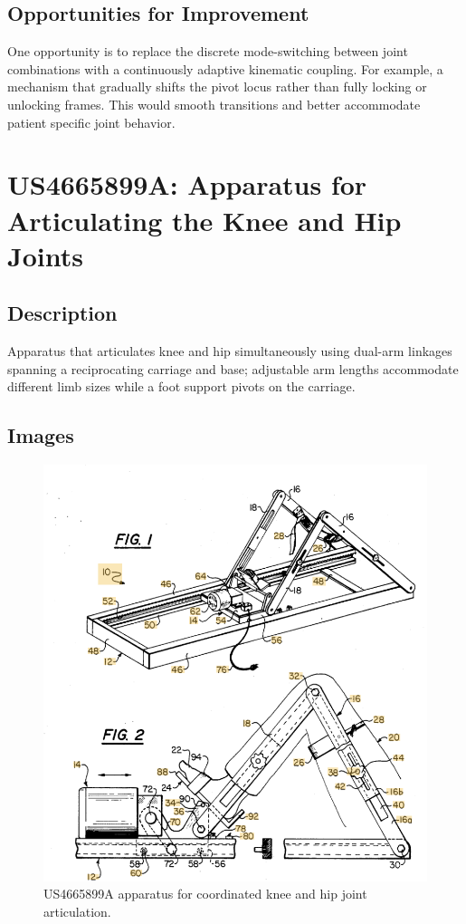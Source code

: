 \documentclass[11pt]{article}
\begin{document}
\subsection{Opportunities for Improvement}
One opportunity is to replace the discrete mode-switching between joint combinations with a continuously adaptive kinematic coupling. For example, a mechanism that gradually shifts the pivot locus rather than fully locking or unlocking frames. This would smooth transitions and better accommodate patient specific joint behavior.

\section{US4665899A: Apparatus for Articulating the Knee and Hip Joints}
\subsection{Description}
Apparatus that articulates knee and hip simultaneously using dual-arm linkages spanning a reciprocating carriage and base; adjustable arm lengths accommodate different limb sizes while a foot support pivots on the carriage.
\subsection{Images}
\begin{figure}[H]
  \centering
  \includegraphics[width=0.54\linewidth]{US4665899A.png}
  \caption{US4665899A apparatus for coordinated knee and hip joint articulation.}
  \label{fig:US4665899A}
\end{figure}
\end{document}
